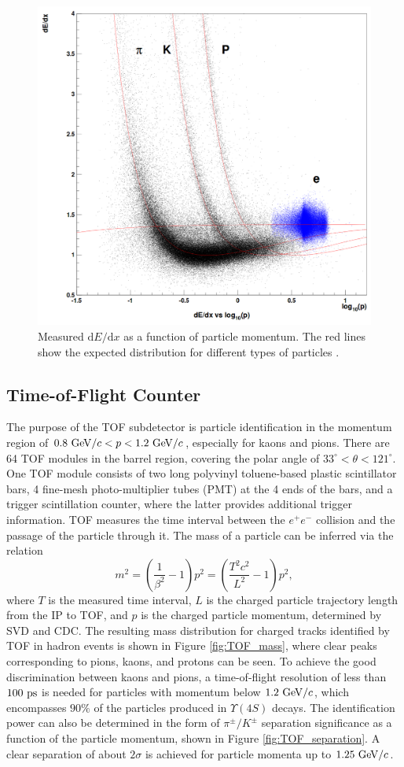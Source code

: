 \begin{figure}[H]
	\centering
	\captionsetup{width=0.8\linewidth}
	\includegraphics[width=0.6\linewidth]{fig/setup/dEdx}
	\caption{Measured $\mathrm{d}E/\mathrm{d}x$ as a function of particle momentum. The red lines show the expected distribution for different types of particles \cite{ABASHIAN2002117}.}
	\label{fig:dEdx}
\end{figure}

\subsection{Time-of-Flight Counter}

The purpose of the TOF subdetector is particle identification in the momentum region of $0.8\mathrm{~GeV}/c < p < 1.2\mathrm{~GeV}/c$, especially for kaons and pions. There are 64 TOF modules in the barrel region, covering the polar angle of $33^\circ < \theta < 121^\circ$. One TOF module consists of two long polyvinyl toluene-based plastic scintillator bars, 4 fine-mesh photo-multiplier tubes (PMT) at the 4 ends of the bars, and a trigger scintillation counter, where the latter provides additional trigger information. TOF measures the time interval between the $e^+e^-$ collision and the passage of the particle through it. The mass of a particle can be inferred via the relation
\begin{equation}
m^2 = \left( \frac{1}{\beta^2}-1\right)p^2 = \left( \frac{T^2c^2}{L^2}-1\right)p^2,
\end{equation}
where $T$ is the measured time interval, $L$ is the charged particle trajectory length from the IP to TOF, and $p$ is the charged particle momentum, determined by SVD and CDC. The resulting mass distribution for charged tracks identified by TOF in hadron events is shown in Figure \ref{fig:TOF_mass}, where clear peaks corresponding to pions, kaons, and protons can be seen. To achieve the good discrimination between kaons and pions, a time-of-flight resolution of less than $100\mathrm{~ps}$ is needed for particles with momentum below $1.2\mathrm{~GeV}/c$, which encompasses $90\%$ of the particles produced in $\Upsilon(4S)$ decays. The identification power can also be determined in the form of $\pi^\pm/K^\pm$ separation significance as a function of the particle momentum, shown in Figure \ref{fig:TOF_separation}. A clear separation of about $2\sigma$ is achieved for particle momenta up to $1.25\mathrm{~GeV}/c$.


